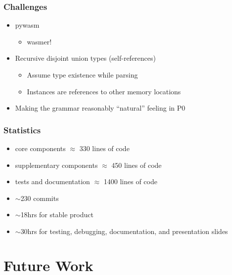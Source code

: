 \documentclass{beamer}
\begin{document}
\begin{frame}
 \frametitle{Challenges}
 \begin{itemize}
  \item<1-> pywasm
  \begin{itemize}
    \item<2-> wasmer!
  \end{itemize}
  
  \item<3-> Recursive disjoint union types (self-references)
  \begin{itemize}
    \item<4-> Assume type existence while parsing
    \item<5-> Instances are references to other memory locations
  \end{itemize}
  
  \item<6-> Making the grammar reasonably ``natural'' feeling in P0
 \end{itemize}

\end{frame}

\begin{frame}
 \frametitle{Statistics}
 \begin{itemize}
  \item<1-> core components $\approx$ 330 lines of code
  \item<2-> supplementary components $\approx$ 450 lines of code
  \item<3-> tests and documentation $\approx$ 1400 lines of code
  \item<4-> $\sim$230 commits
  \item<5-> $\sim$18hrs for stable product
  \item<6-> $\sim$30hrs for testing, debugging, documentation, and presentation slides
 \end{itemize}

\end{frame}



\section{Future Work}
\end{document}
